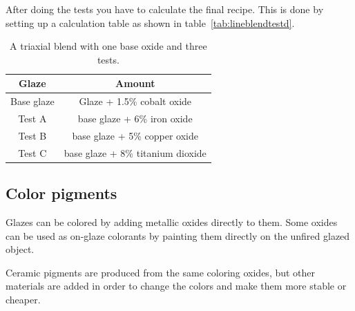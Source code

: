 After doing the tests you have to calculate the final recipe. This is done by 
setting up a calculation table as shown in table~\ref{tab:lineblendtestd}.
\begin{center}
  \renewcommand{\arraystretch}{1.5}
  \begin{table}\centering
    \begin{tabular}{|c|c|}\hline
      \textbf{Glaze}&\textbf{Amount}\\\hline\hline
      Base glaze&Glaze + 1.5\% cobalt oxide\\\hline
      Test A&base glaze + 6\% iron oxide\\\hline
      Test B&base glaze + 5\% copper oxide\\\hline
      Test C&base glaze + 8\% titanium dioxide\\\hline
    \end{tabular}
    \caption{A triaxial blend with one base oxide and three tests.}
    \label{tab:lineblendoxide}
  \end{table}
\end{center}
\subsection{Color pigments}
Glazes can be colored by adding metallic oxides directly to them. Some oxides 
can be used as on-glaze colorants by painting them directly on the unfired 
glazed object.

Ceramic pigments are produced from the same coloring oxides, but other 
materials are added in order to change the colors and make them more stable or 
cheaper.
